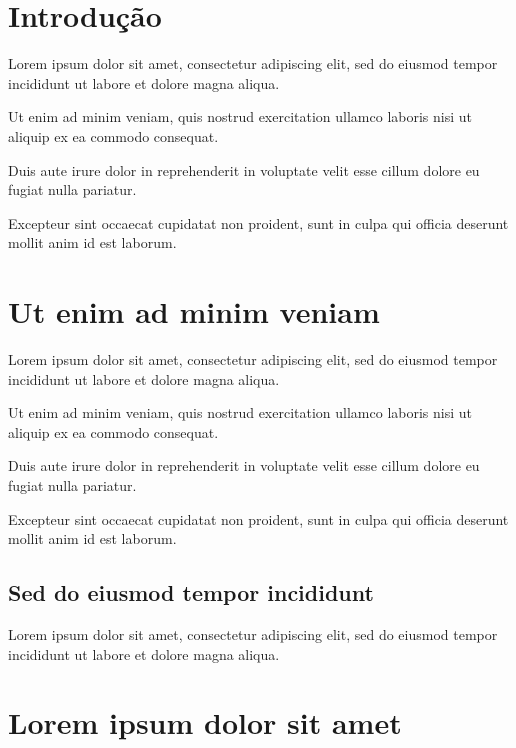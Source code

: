 \documentclass[]{fateczl-abntex2}
\begin{document}

\frenchspacing 

\imprimircapa

\imprimirfolhaderosto

\tableofcontents*
\cleardoublepage

\textual

\chapter{Introdução}

Lorem ipsum dolor sit amet, consectetur adipiscing elit, sed do eiusmod tempor incididunt ut labore et dolore magna aliqua.

Ut enim ad minim veniam, quis nostrud exercitation ullamco laboris nisi ut aliquip ex ea commodo consequat.

Duis aute irure dolor in reprehenderit in voluptate velit esse cillum dolore eu fugiat nulla pariatur. 

Excepteur sint occaecat cupidatat non proident, sunt in culpa qui officia deserunt mollit anim id est laborum.

\chapter{Ut enim ad minim veniam}

Lorem ipsum dolor sit amet, consectetur adipiscing elit, sed do eiusmod tempor incididunt ut labore et dolore magna aliqua.

Ut enim ad minim veniam, quis nostrud exercitation ullamco laboris nisi ut aliquip ex ea commodo consequat.

Duis aute irure dolor in reprehenderit in voluptate velit esse cillum dolore eu fugiat nulla pariatur. 

Excepteur sint occaecat cupidatat non proident, sunt in culpa qui officia deserunt mollit anim id est laborum.

\section{Sed do eiusmod tempor incididunt}

Lorem ipsum dolor sit amet, consectetur adipiscing elit, sed do eiusmod tempor incididunt ut labore et dolore magna aliqua.

\chapter{Lorem ipsum dolor sit amet}
\end{document}
